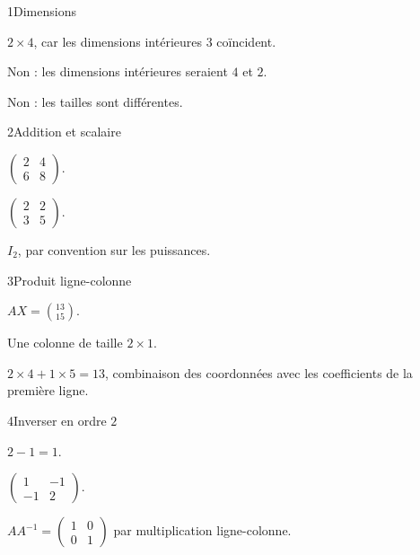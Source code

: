 \begin{corrige}{1}{Dimensions}
\begin{questions}
\item $2\times4$, car les dimensions intérieures $3$ coïncident.
\item Non : les dimensions intérieures seraient $4$ et $2$.
\item Non : les tailles sont différentes.
\end{questions}
\end{corrige}
\begin{corrige}{2}{Addition et scalaire}
\begin{questions}
\item $\begin{pmatrix}2&4\\6&8\end{pmatrix}$.
\item $\begin{pmatrix}2&2\\3&5\end{pmatrix}$.
\item $I_2$, par convention sur les puissances.
\end{questions}
\end{corrige}
\begin{corrige}{3}{Produit ligne-colonne}
\begin{questions}
\item $AX=\binom{13}{15}$.
\item Une colonne de taille $2\times1$.
\item $2\times4+1\times5=13$, combinaison des coordonnées avec les coefficients de la première ligne.
\end{questions}
\end{corrige}
\begin{corrige}{4}{Inverser en ordre $2$}
\begin{questions}
\item $2-1=1$.
\item $\begin{pmatrix}1&-1\\-1&2\end{pmatrix}$.
\item $AA^{-1}=\begin{pmatrix}1&0\\0&1\end{pmatrix}$ par multiplication ligne-colonne.
\end{questions}
\end{corrige}
